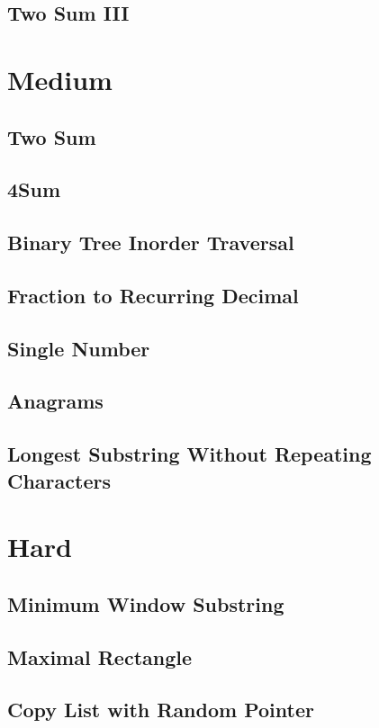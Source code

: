 \documentclass[11pt]{book}
\begin{document}
\subsection{Two Sum III}
\label{sec-6-1-2}
\section{Medium}
\label{sec-6-2}
\subsection{Two Sum}
\label{sec-6-2-1}
\subsection{4Sum}
\label{sec-6-2-2}
\subsection{Binary Tree Inorder Traversal}
\label{sec-6-2-3}
\subsection{Fraction to Recurring Decimal}
\label{sec-6-2-4}
\subsection{Single Number}
\label{sec-6-2-5}
\subsection{Anagrams}
\label{sec-6-2-6}
\subsection{Longest Substring Without Repeating Characters}
\label{sec-6-2-7}
\section{Hard}
\label{sec-6-3}
\subsection{Minimum Window Substring}
\label{sec-6-3-1}
\subsection{Maximal Rectangle}
\label{sec-6-3-2}
\subsection{Copy List with Random Pointer}
\label{sec-6-3-3}
\end{document}
